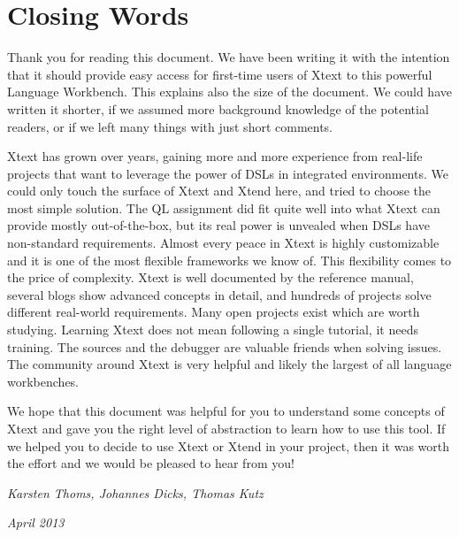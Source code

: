 \section{Closing Words}

Thank you for reading this document. We have been writing it with the intention
that it should provide easy access for first-time users of Xtext to this
powerful Language Workbench. This explains also the size of the document. We
could have written it shorter, if we assumed more background knowledge of
the potential readers, or if we left many things with just short
comments.

Xtext has grown over years, gaining more and more
experience from real-life projects that want to leverage the power of DSLs in
integrated environments. We could only touch the surface of Xtext and Xtend
here, and tried to choose the most simple solution. The QL assignment did fit
quite well into what Xtext can provide mostly out-of-the-box, but its real power
is unvealed when DSLs have non-standard requirements. Almost every peace in
Xtext is highly customizable and it is one of the most flexible frameworks we
know of. This flexibility comes to the price of complexity. Xtext is well
documented by the reference manual, several blogs show advanced concepts in
detail, and hundreds of projects solve different real-world requirements. Many
open projects exist which are worth studying. Learning Xtext does not mean
following a single tutorial, it needs training. The sources and the debugger are
valuable friends when solving issues. The community around Xtext is very helpful
and likely the largest of all language workbenches.

We hope that this document was helpful for you to understand some concepts of
Xtext and gave you the right level of abstraction to learn how to use this tool.
If we helped you to decide to use Xtext or Xtend in your project, then it was
worth the effort and we would be pleased to hear from you! 

\par
\par
\par

\emph{\large{Karsten Thoms, Johannes Dicks, Thomas Kutz}}

\emph{April 2013}

